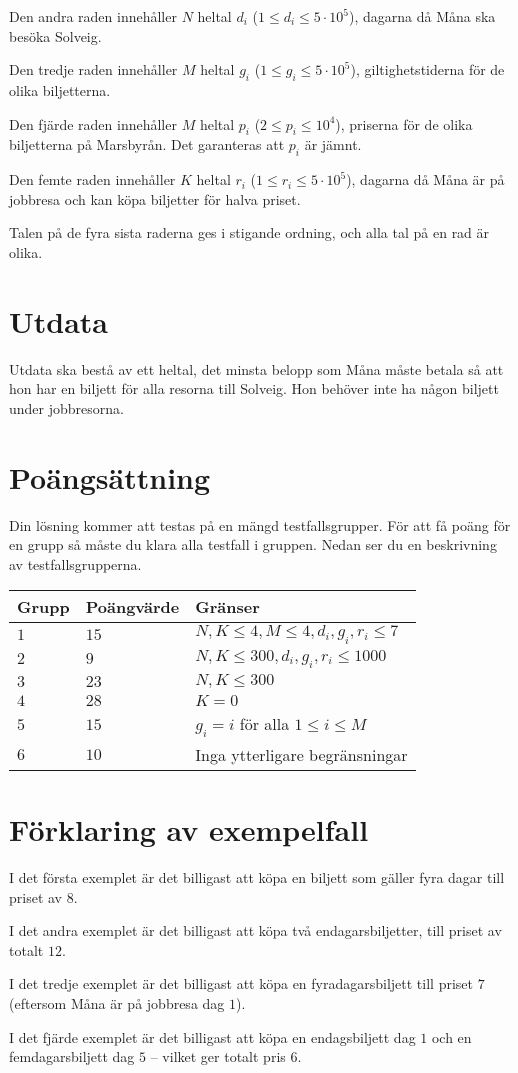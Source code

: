 Den andra raden innehåller $N$ heltal $d_i$ ($1 \leq d_i \leq 5\cdot10^5$), dagarna då Måna ska besöka Solveig.

Den tredje raden innehåller $M$ heltal $g_i$ ($1 \leq g_i \leq 5\cdot10^5$), giltighetstiderna för de olika biljetterna.

Den fjärde raden innehåller $M$ heltal $p_i$ ($2 \leq p_i \leq 10^4$), priserna för de olika biljetterna på Marsbyrån. Det garanteras att $p_i$ är jämnt.

Den femte raden innehåller $K$ heltal $r_i$ ($1 \leq r_i \leq 5\cdot10^5$), dagarna då Måna är på jobbresa och kan köpa biljetter för halva priset.

Talen på de fyra sista raderna ges i stigande ordning, och alla tal på en rad är olika.

\section*{Utdata}
Utdata ska bestå av ett heltal, det minsta belopp som Måna måste betala så att hon har en biljett för alla resorna till Solveig. Hon behöver inte ha någon biljett under jobbresorna.

\section*{Poängsättning}
Din lösning kommer att testas på en mängd testfallsgrupper.
För att få poäng för en grupp så måste du klara alla testfall i gruppen.
Nedan ser du en beskrivning av testfallsgrupperna.

\noindent
\begin{tabular}{| l | l | l |}
\hline
Grupp & Poängvärde & Gränser \\ \hline
$1$    & $15$         & $N, K\leq 4, M\leq 4, d_i,g_i,r_i\leq 7$ \\ \hline
$2$    & $9$         & $N, K\leq 300, d_i,g_i,r_i\leq 1000$ \\ \hline
$3$    & $23$         & $N, K\leq 300$ \\ \hline
$4$    & $28$         & $K=0$ \\ \hline
$5$    & $15$         & $g_i=i$ för alla $1\leq i\leq M$ \\ \hline
$6$    & $10$         & Inga ytterligare begränsningar \\ \hline
\end{tabular}

\section*{Förklaring av exempelfall}
I det första exemplet är det billigast att köpa en biljett som gäller fyra dagar till priset av $8$.

I det andra exemplet är det billigast att köpa två endagarsbiljetter, till priset av totalt $12$.

I det tredje exemplet är det billigast att köpa en fyradagarsbiljett till priset $7$ (eftersom Måna är på jobbresa dag $1$).

I det fjärde exemplet är det billigast att köpa en endagsbiljett dag $1$ och en femdagarsbiljett dag $5$ -- vilket ger totalt pris $6$.
